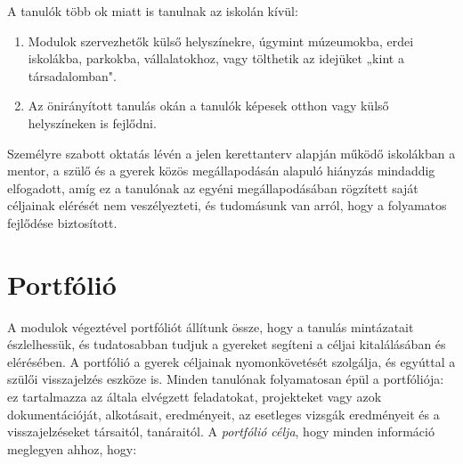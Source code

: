 A tanulók több ok miatt is tanulnak az iskolán kívül:
\begin{enumerate}
\item Modulok szervezhetők külső helyszínekre, úgymint múzeumokba, erdei iskolákba, parkokba, vállalatokhoz, vagy tölthetik az idejüket „kint a társadalomban".

\item Az önirányított tanulás okán a tanulók képesek otthon vagy külső helyszíneken is fejlődni.
\end{enumerate}
Személyre szabott oktatás lévén a jelen kerettanterv alapján működő iskolákban a mentor, a szülő és a gyerek közös megállapodásán alapuló hiányzás mindaddig elfogadott, amíg ez a tanulónak az  egyéni megállapodásában rögzített saját céljainak elérését nem veszélyezteti, és tudomásunk van arról, hogy a folyamatos fejlődése biztosított.

\section{Portfólió}


A modulok végeztével portfóliót állítunk össze, hogy a tanulás mintázatait észlelhessük, és tudatosabban tudjuk a gyereket segíteni a céljai kitalálásában és elérésében. A portfólió a gyerek céljainak nyomonkövetését szolgálja, és egyúttal a szülői visszajelzés eszköze is. Minden tanulónak folyamatosan épül a portfóliója: ez tartalmazza az általa elvégzett feladatokat, projekteket vagy azok dokumentációját, alkotásait, eredményeit, az esetleges vizsgák eredményeit és a visszajelzéseket társaitól, tanáraitól. A \emph{portfólió célja}, hogy minden információ meglegyen ahhoz, hogy:

